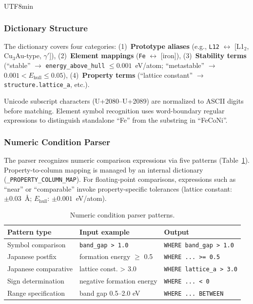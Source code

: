 \documentclass[sn-mathphys,Numbered]{sn-jnl}
\begin{document}
\begin{CJK}{UTF8}{min}
\subsubsection{Dictionary Structure}

The dictionary covers four categories:
(1)~\textbf{Prototype aliases} (e.g., \texttt{L12} $\leftrightarrow$
[L1$_2$, Cu$_3$Au-type, $\gamma'$]),
(2)~\textbf{Element mappings} (\texttt{Fe} $\leftrightarrow$ [iron]),
(3)~\textbf{Stability terms} (``stable'' $\to$
\texttt{energy\_above\_hull} $\leq 0.001$~eV/atom;
``metastable'' $\to$ $0.001 < E_\text{hull} \leq 0.05$),
(4)~\textbf{Property terms} (``lattice constant'' $\to$
\texttt{structure.lattice\_a}, etc.).

Unicode subscript characters (U+2080--U+2089) are normalized to ASCII
digits before matching.
Element symbol recognition uses word-boundary regular expressions to
distinguish standalone ``Fe'' from the substring in ``FeCoNi''.

\subsubsection{Numeric Condition Parser}

The parser recognizes numeric comparison expressions via five patterns
(Table~\ref{tab:numeric_patterns}).
Property-to-column mapping is managed by an internal dictionary
(\texttt{\_PROPERTY\_COLUMN\_MAP}).
For floating-point comparisons, expressions such as ``near'' or
``comparable'' invoke property-specific tolerances
(lattice constant: $\pm 0.03$~\AA;
$E_\text{hull}$: $\pm 0.001$~eV/atom).

\begin{table}[t]
  \centering
  \caption{Numeric condition parser patterns.}
  \label{tab:numeric_patterns}
  \scriptsize
  \begin{tabular}{lll}
    \toprule
    Pattern type & Input example & Output \\
    \midrule
    Symbol comparison & \texttt{band\_gap > 1.0} & \texttt{WHERE band\_gap > 1.0} \\
    Japanese postfix & formation energy $\geq$ 0.5 & \texttt{WHERE ... >= 0.5} \\
    Japanese comparative & lattice const. > 3.0 & \texttt{WHERE lattice\_a > 3.0} \\
    Sign determination & negative formation energy & \texttt{WHERE ... < 0} \\
    Range specification & band gap 0.5--2.0 eV & \texttt{WHERE ... BETWEEN} \\
    \bottomrule
  \end{tabular}
\end{table}


\end{CJK}
\end{document}
